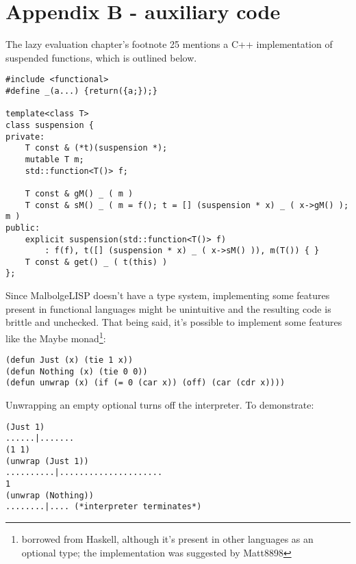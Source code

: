 
\chapter*{Appendix B - auxiliary code}

\par The lazy evaluation chapter's footnote 25 mentions a C++ implementation of suspended functions, which is outlined below.

\begin{verbatim}
#include <functional>
#define _(a...) {return({a;});}

template<class T>
class suspension {
private:
    T const & (*t)(suspension *);
    mutable T m;
    std::function<T()> f;
    
    T const & gM() _ ( m )
    T const & sM() _ ( m = f(); t = [] (suspension * x) _ ( x->gM() ); m )
public:
    explicit suspension(std::function<T()> f)
        : f(f), t([] (suspension * x) _ ( x->sM() )), m(T()) { }
    T const & get() _ ( t(this) )
};
\end{verbatim}

\par Since MalbolgeLISP doesn't have a type system, implementing some features present in functional languages might be unintuitive and the resulting code is brittle and unchecked. That being said, it's possible to implement some features like the Maybe monad\footnote{borrowed from Haskell, although it's present in other languages as an optional type; the implementation was suggested by Matt8898}:

\begin{verbatim}
(defun Just (x) (tie 1 x))
(defun Nothing (x) (tie 0 0))
(defun unwrap (x) (if (= 0 (car x)) (off) (car (cdr x))))
\end{verbatim}

\par Unwrapping an empty optional turns off the interpreter. To demonstrate:

\begin{verbatim}
(Just 1)
......|.......
(1 1)
(unwrap (Just 1))
..........|.....................
1
(unwrap (Nothing))
........|.... (*interpreter terminates*)
\end{verbatim}

